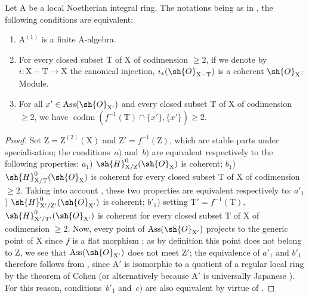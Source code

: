\begin{proposition}[7.2.3]
\label{IV.7.2.3}
Let $\mathrm{A}$ be a local Noetherian integral ring.
The notations being as in , the following conditions are equivalent:
\begin{enumerate}[label=\emph{\alph*)}]
  \item $\mathrm{A}^{(1)}$ is a finite A-algebra.
  \item For every closed subset $\mathrm{T}$ of $\mathrm{X}$ of codimension $\geqslant 2$, if we denote by $i:\mathrm{X}-\mathrm{T}\to\mathrm{X}$ the canonical injection, $i_*(\sh{O}_{\mathrm{X}-\mathrm{T}})$ is a coherent $\sh{O}_\mathrm{X}$-Module.
  \item For all $x'\in\operatorname{Ass}(\sh{O}_{\mathrm{X}'})$ and every closed subset $\mathrm{T}$ of $\mathrm{X}$ of codimension $\geqslant 2$, we have $\operatorname{codim}(f^{-1}(\mathrm{T})\cap\overline{\{x'\}},\overline{\{x'\}})\geqslant 2$.
\end{enumerate}
\end{proposition}

\begin{proof}
Set $\mathrm{Z}=\mathrm{Z}^{(2)}(\mathrm{X})$  and $\mathrm{Z}'=f^{-1}(\mathrm{Z})$, which are stable parts under specialisation; the conditions~$a)$ and~$b)$ are equivalent respectively to the following properties:
$a_1$) $\sh{H}^0_{\mathrm{X}/\mathrm{Z}}(\sh{O}_\mathrm{X})$ is coherent;
$b_1$) $\sh{H}^0_{\mathrm{X}/\mathrm{T}}(\sh{O}_\mathrm{X})$ is coherent for every closed subset $\mathrm{T}$ of $\mathrm{X}$ of codimension $\geqslant 2$.
Taking into account , these two properties are equivalent respectively to:
$a'_1$) $\sh{H}^0_{\mathrm{X}'/\mathrm{Z}'}(\sh{O}_{\mathrm{X}'})$ is coherent;
$b'_1$) setting $\mathrm{T}'=f^{-1}(\mathrm{T})$, $\sh{H}^0_{\mathrm{X}'/\mathrm{T}'}(\sh{O}_{\mathrm{X}'})$ is coherent for every closed subset $\mathrm{T}$ of $\mathrm{X}$ of codimension $\geqslant 2$.
Now, every point of $\operatorname{Ass}(\sh{O}_{\mathrm{X}'})$ projects to the generic point of $\mathrm{X}$ since $f$ is a flat morphism ; as by definition this point does not belong to $\mathrm{Z}$, we see that $\operatorname{Ass}(\sh{O}_{\mathrm{X}'})$ does not meet $\mathrm{Z}'$; the equivalence of $a'_1$ and $b'_1$ therefore follows from , since $\mathrm{A}'$ is isomorphic to a quotient of a regular local ring by the theorem of Cohen  (or alternatively
because $\mathrm{A}'$ is universally Japanese ).
For this reason, conditions~$b'_1$ and~$c)$ are also equivalent by virtue of .
\end{proof}

